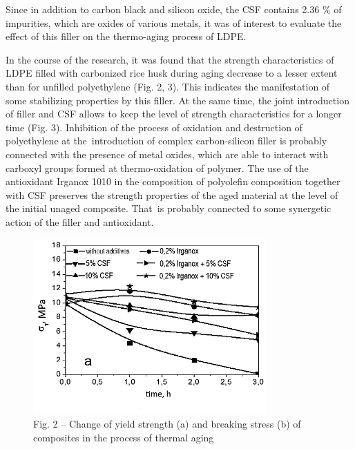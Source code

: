 \begin{multicols}{2}
Since in addition to carbon black and silicon oxide, the CSF contains
2.36 \% of impurities, which are oxides of various metals, it was of
interest to evaluate the effect of this filler on the thermo-aging
process of LDPE.

In the course of the research, it was found that the strength
characteristics of LDPE filled with carbonized rice husk during aging
decrease to a lesser extent than for unfilled polyethylene (Fig. 2, 3).
This indicates the manifestation of some stabilizing properties by this
filler. At the same time, the joint introduction of filler and CSF
allows to keep the level of strength characteristics for a longer time
(Fig. 3). Inhibition of the process of oxidation and destruction of
polyethylene at the~introduction of complex carbon-silicon filler is
probably connected with the presence of metal oxides, which are able to
interact with carboxyl groups formed at thermo-oxidation of polymer. The
use of the antioxidant Irganox 1010 in the composition of polyolefin
composition together with CSF preserves the strength properties of the
aged material at the level of the initial unaged composite. That~is
probably connected to some synergetic action of the filler and
antioxidant.
\end{multicols}

\begin{figure}[H]
	\centering
	\includegraphics[width=0.8\textwidth]{media/chem/image20}
	\caption*{Fig. 2 -- Change of yield strength (a) and breaking stress (b)
of composites in the process of thermal aging}
\end{figure}

